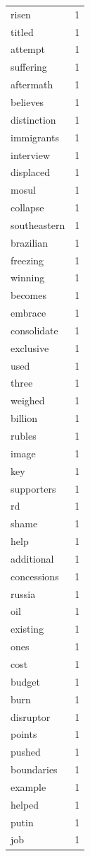 \begin{tabular}{lr}
risen & 1 \\
titled & 1 \\
attempt & 1 \\
suffering & 1 \\
aftermath & 1 \\
believes & 1 \\
distinction & 1 \\
immigrants & 1 \\
interview & 1 \\
displaced & 1 \\
mosul & 1 \\
collapse & 1 \\
southeastern & 1 \\
brazilian & 1 \\
freezing & 1 \\
winning & 1 \\
becomes & 1 \\
embrace & 1 \\
consolidate & 1 \\
exclusive & 1 \\
used & 1 \\
three & 1 \\
weighed & 1 \\
billion & 1 \\
rubles & 1 \\
image & 1 \\
key & 1 \\
supporters & 1 \\
rd & 1 \\
shame & 1 \\
help & 1 \\
additional & 1 \\
concessions & 1 \\
russia & 1 \\
oil & 1 \\
existing & 1 \\
ones & 1 \\
cost & 1 \\
budget & 1 \\
burn & 1 \\
disruptor & 1 \\
points & 1 \\
pushed & 1 \\
boundaries & 1 \\
example & 1 \\
helped & 1 \\
putin & 1 \\
job & 1 \\

\end{tabular}
